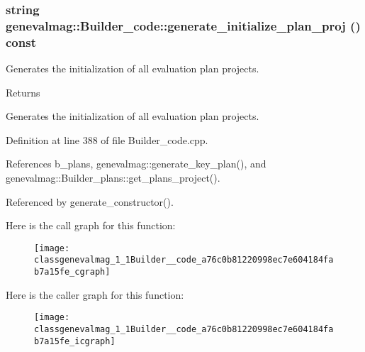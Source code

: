 \hypertarget{classgenevalmag_1_1Builder__code_a76c0b81220998ec7e604184fab7a15fe}{
\subsubsection[{generate\_\-initialize\_\-plan\_\-proj}]{\setlength{\rightskip}{0pt plus 5cm}string genevalmag::Builder\_\-code::generate\_\-initialize\_\-plan\_\-proj () const}}
\label{classgenevalmag_1_1Builder__code_a76c0b81220998ec7e604184fab7a15fe}
Generates the initialization of all evaluation plan projects. \begin{DoxyReturn}{Returns}

\end{DoxyReturn}
Generates the initialization of all evaluation plan projects. 

Definition at line 388 of file Builder\_\-code.cpp.



References b\_\-plans, genevalmag::generate\_\-key\_\-plan(), and genevalmag::Builder\_\-plans::get\_\-plans\_\-project().



Referenced by generate\_\-constructor().



Here is the call graph for this function:\nopagebreak
\begin{figure}[H]
\begin{center}
\leavevmode
\texttt{[image: classgenevalmag\_1\_1Builder\_\_code\_a76c0b81220998ec7e604184fab7a15fe\_cgraph]}
\end{center}
\end{figure}




Here is the caller graph for this function:\nopagebreak
\begin{figure}[H]
\begin{center}
\leavevmode
\texttt{[image: classgenevalmag\_1\_1Builder\_\_code\_a76c0b81220998ec7e604184fab7a15fe\_icgraph]}
\end{center}
\end{figure}


